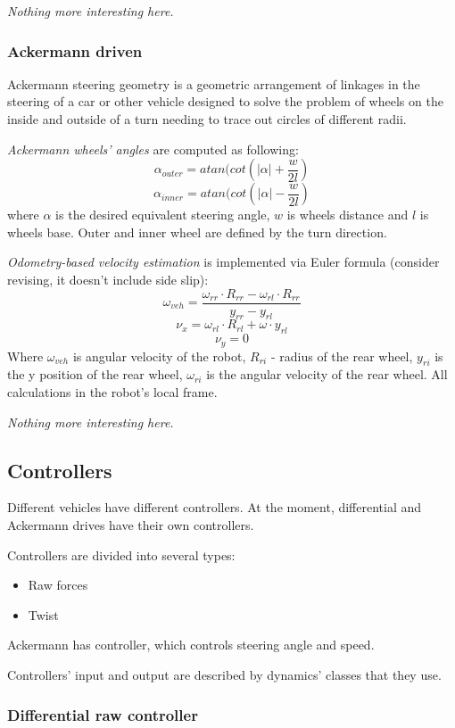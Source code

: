 \documentclass[a4paper,11pt]{article}
\begin{document}
\textit{Nothing more interesting here.}
\subsubsection{Ackermann driven}

Ackermann steering geometry is a geometric arrangement of linkages in the steering of a car or other vehicle designed to solve the problem of wheels on the inside and outside of a turn needing to trace out circles of different radii.

\textit{Ackermann wheels' angles }are computed as following:
\[
\alpha_{outer} = atan(cot(|\alpha| + \frac{w}{2l})
\]
\[
\alpha_{inner} = atan(cot(|\alpha| - \frac{w}{2l})
\]
where $\alpha$ is the desired equivalent steering angle, $w$ is wheels distance and $l$ is wheels base.
Outer and inner wheel are defined by the turn direction.



\textit{Odometry-based velocity estimation} is implemented via Euler formula (consider revising, it doesn't include side slip):
\[
\omega_{veh} = \frac{\omega_{rr} \cdot R_{rr} - \omega_{rl} \cdot R_{rr}}{y_{rr} - y_{rl}}
\]
\[
\nu_x = \omega_{rl} \cdot R_{rl} + \omega \cdot y_{rl}
\]
\[
\nu_y = 0
\]
Where $\omega_{veh}$ is angular velocity of the robot, $R_{ri}$ - radius of the rear wheel, $y_{ri}$ is the y position of the rear wheel, $\omega_{ri}$ is the angular velocity of the rear wheel. All calculations in the robot's local frame. 


\textit{Nothing more interesting here.}


\subsection{Controllers}

Different vehicles have different controllers. 
At the moment, differential and Ackermann drives have their own controllers. 

Controllers are divided into several types: 
\begin{itemize}
\item Raw forces
\item Twist
\end{itemize}

Ackermann has controller, which controls steering angle and speed. 

Controllers' input and output are described by dynamics' classes that they use. 

\subsubsection{Differential raw controller}
\end{document}
